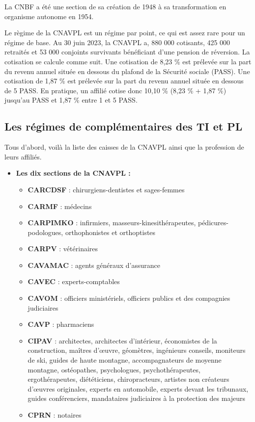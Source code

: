 La CNBF a été une section de sa création de 1948 à sa transformation en organisme autonome en 1954.

Le règime de la CNAVPL est un régime par point, ce qui est assez rare pour un régime de base. Au 30 juin 2023, la CNAVPL a, 880 000 cotisants, 425 000 retraités et 53 000 conjoints survivants bénéficiant d'une pension de réversion. La cotisation se calcule comme suit. Une cotisation de 8,23 \% est prélevée sur la part du revenu annuel située en dessous du plafond de la Sécurité sociale (PASS). Une cotisation de 1,87 \% est prélevée sur la part du revenu annuel située en dessous de 5 PASS.
En pratique, un affilié cotise donc 10,10 \% (8,23 \% + 1,87 \%) jusqu'au PASS et 1,87 \% entre 1 et 5 PASS.


\subsection{Les régimes de complémentaires des TI et PL}

Tous d'abord, voilà la liste des caisses de la CNAVPL ainsi que la profession de leurs affiliés.

\begin{itemize}
    \item \textbf{Les dix sections de la CNAVPL :}
    \begin{itemize}
        \item \textbf{CARCDSF} : chirurgiens-dentistes et sages-femmes
        \item \textbf{CARMF} : médecins
        \item \textbf{CARPIMKO} : infirmiers, masseurs-kinesithérapeutes, pédicures-podologues, orthophonistes et orthoptistes
        \item \textbf{CARPV} : vétérinaires
        \item \textbf{CAVAMAC} : agents généraux d’assurance
        \item \textbf{CAVEC} : experts-comptables
        \item \textbf{CAVOM} : officiers ministériels, officiers publics et des compagnies judiciaires
        \item \textbf{CAVP} : pharmaciens
        \item \textbf{CIPAV} : architectes, architectes d’intérieur, économistes de la construction, maîtres d’œuvre, géomètres, ingénieurs conseils, moniteurs de ski, guides de haute montagne, accompagnateurs de moyenne montagne, ostéopathes, psychologues, psychothérapeutes, ergothérapeutes, diététiciens, chiropracteurs, artistes non créateurs d’œuvres originales, experts en automobile, experts devant les tribunaux, guides conférenciers, mandataires judiciaires à la protection des majeurs
        \item \textbf{CPRN} : notaires
    \end{itemize}
\end{itemize}


